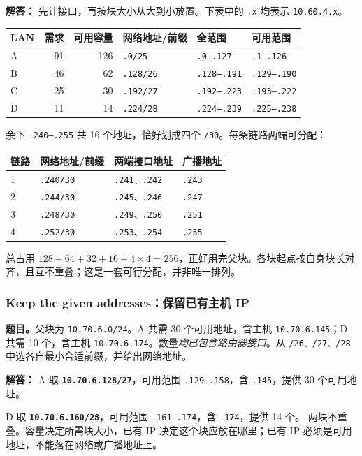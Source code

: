 \documentclass[11pt,a4paper,fontset=fandol]{ctexart}
\renewcommand{\exercisequestion}[2]{%
  \Needspace{5\baselineskip}%
  \subsubsection{#2}\label{exercise:#1}%
}
\renewenvironment{checkedsolution}
  {\par\nopagebreak[4]\textbf{解答：}\ignorespaces}
  {\par}
\begin{document}
\begin{checkedsolution}
先计接口，再按块大小从大到小放置。下表中的 \texttt{.x} 均表示 \texttt{10.60.4.x}。
\begin{center}
\small
\begin{tabular}{@{}lrrlll@{}}
\toprule
LAN & 需求 & 可用容量 & 网络地址/前缀 & 全范围 & 可用范围 \\
\midrule
A & 91 & 126 & \texttt{.0/25} & \texttt{.0--.127} & \texttt{.1--.126} \\
B & 46 & 62 & \texttt{.128/26} & \texttt{.128--.191} & \texttt{.129--.190} \\
C & 25 & 30 & \texttt{.192/27} & \texttt{.192--.223} & \texttt{.193--.222} \\
D & 11 & 14 & \texttt{.224/28} & \texttt{.224--.239} & \texttt{.225--.238} \\
\bottomrule
\end{tabular}
\end{center}
余下 \texttt{.240--.255} 共 16 个地址，恰好划成四个 \texttt{/30}。每条链路两端可分配：
\begin{center}
\small
\begin{tabular}{@{}llll@{}}
\toprule
链路 & 网络地址/前缀 & 两端接口地址 & 广播地址 \\
\midrule
1 & \texttt{.240/30} & \texttt{.241、.242} & \texttt{.243} \\
2 & \texttt{.244/30} & \texttt{.245、.246} & \texttt{.247} \\
3 & \texttt{.248/30} & \texttt{.249、.250} & \texttt{.251} \\
4 & \texttt{.252/30} & \texttt{.253、.254} & \texttt{.255} \\
\bottomrule
\end{tabular}
\end{center}
总占用 $128+64+32+16+4\times4=256$，正好用完父块。各块起点按自身块长对齐，且互不重叠；这是一套可行分配，并非唯一排列。
\end{checkedsolution}

\exercisequestion{SC2008-HW01-Q06}{Keep the given addresses：保留已有主机 IP}

\textbf{题目。}父块为 \texttt{10.70.6.0/24}。A 共需 30 个可用地址，含主机 \texttt{10.70.6.145}；D 共需 10 个，含主机 \texttt{10.70.6.174}。数量\emph{均已包含路由器接口}。从 \texttt{/26、/27、/28} 中选各自最小合适前缀，并给出网络地址。

\begin{checkedsolution}
A 取 \textbf{\texttt{10.70.6.128/27}}，可用范围 \texttt{.129--.158}，含 \texttt{.145}，提供 30 个可用地址。

D 取 \textbf{\texttt{10.70.6.160/28}}，可用范围 \texttt{.161--.174}，含 \texttt{.174}，提供 14 个。
两块不重叠。容量决定所需块大小，已有 IP 决定这个块应放在哪里；已有 IP 必须是可用地址，不能落在网络或广播地址上。
\end{checkedsolution}
\end{document}
